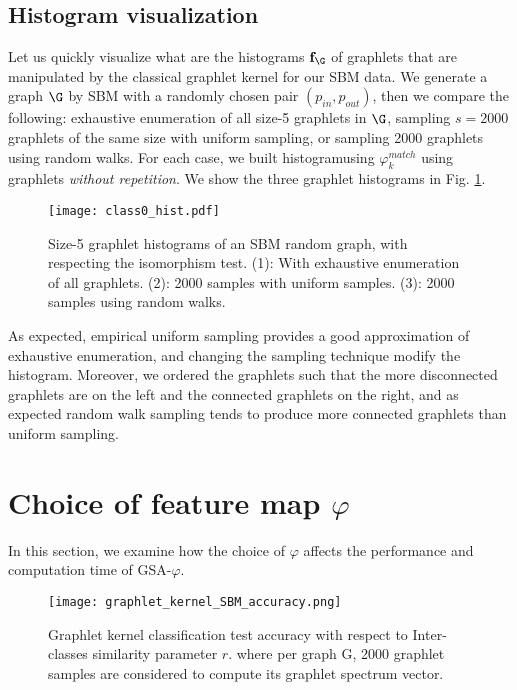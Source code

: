 \subsection{Histogram visualization}
Let us quickly visualize what are the histograms $\mathbf{f}_\G$ of graphlets that are manipulated by the classical graphlet kernel for our SBM data. We generate a graph $\G$ by SBM with a randomly chosen pair $(p_{in},p_{out})$, then we compare the following: exhaustive enumeration of all size-5 graphlets in $\G$, sampling $s=2000$ graphlets of the same size with uniform sampling, or sampling 2000 graphlets using random walks. For each case, we built histogramusing $\varphi^{match}_k$ using graphlets \emph{without repetition}. We show the three graphlet histograms in Fig. \ref{fig:graphlet_hist}. 

\begin{figure}[H]
\centering
\texttt{[image: class0\_hist.pdf]}
\caption[Graphlet histograms of uniform and random walk sampling techniques]{Size-5 graphlet histograms of an SBM random graph, with respecting the isomorphism test. (1): With exhaustive enumeration of all graphlets. (2): 2000 samples with uniform samples. (3): 2000 samples using random walks. }
\label{fig:graphlet_hist}
\end{figure}

As expected, empirical uniform sampling provides a good approximation of exhaustive enumeration, and changing the sampling technique modify the histogram. Moreover, we ordered the graphlets such that the more disconnected graphlets are on the left and the connected graphlets on the right, and as expected random walk sampling tends to produce more connected graphlets than uniform sampling.

\section{Choice of feature map $\varphi$}

In this section, we examine how the choice of $\varphi$ affects the performance and computation time of GSA-$\varphi$.

\begin{figure}[H]
\centering
\texttt{[image: graphlet\_kernel\_SBM\_accuracy.png]}
\caption[Graphlet kernel classification test accuracy as a function of Inter-classes similarity parameter]{Graphlet kernel classification test accuracy with respect to Inter-classes similarity parameter $r$. where per graph G, 2000 graphlet samples are considered to compute its graphlet spectrum vector. }
\label{fig:graphlet_kernel_SBM}
\end{figure}

